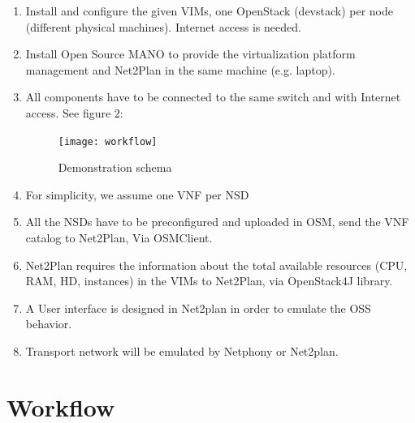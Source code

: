 \documentclass[]{scrartcl}
\begin{document}
\begin{enumerate}
	\item Install and configure the given VIMs, one OpenStack (devstack) per node (different physical machines). Internet access is needed. 
	\item Install Open Source MANO to provide the virtualization platform management and Net2Plan in the same machine (e.g. laptop).
	\item All components have to be connected to the same switch and with Internet access. See figure 2:
	
	\begin{figure}[h!]
		\centering
		\label{fig:workflow}
		\texttt{[image: workflow]}
		\caption{Demonstration schema}
	\end{figure}
	
	\item For simplicity, we assume one VNF per NSD
	\item All the NSDs have to be preconfigured and uploaded in OSM, send the VNF catalog to Net2Plan, Via OSMClient.
	\item Net2Plan requires the information about the total available resources (CPU, RAM, HD, instances) in the VIMs to Net2Plan, via OpenStack4J library.
	\item A User interface is designed in Net2plan in order to emulate the OSS behavior.
	\item Transport network will be emulated by Netphony or Net2plan.
\end{enumerate}

\section{Workflow}
\end{document}
